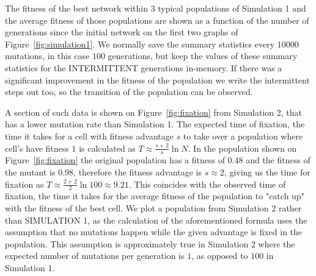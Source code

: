 \documentclass[a4paper,12pt]{article}
\begin{document}
The fitness of the best network within $3$ typical populations of Simulation 1 and the average fitness of those populations are shown as a function of the number of generations since the initial network on the first two graphs of Figure~\ref{fig:simulation1}. We normally save the summary statistics every $10000$ mutations, in this case $100$ generations, but keep the values of these summary statistics for the INTERMITTENT generations in-memory. If there was a significant improvement in the fitness of the population we write the intermittent steps out too, so the transition of the population can be observed. 

A section of such data is shown on Figure~\ref{fig:fixation} from Simulation 2, that has a lower mutation rate than Simulation 1. The expected time of fixation, the time it takes for a cell with fitness advantage $s$ to take over a population where cell's have fitness $1$ is calculated as $T \approx \frac{s+2}{s}\ln N$. \cite{barteklecture} In the population shown on Figure~\ref{fig:fixation} the original population has a fitness of $0.48$ and the fitness of the mutant is $0.98$, therefore the fitness advantage is $s\approx2$, giving us the time for fixation as $T\approx \frac{2+2}{2}\ln 100 \approx 9.21$. This coincides with the observed time of fixation, the time it takes for the average fitness of the population to "catch up" with the fitness of the best cell. We plot a population from Simulation 2 rather than SIMULATION 1, as the calculation of the aforementioned formula uses the assumption that no mutations happen while the given advantage is fixed in the population. This assumption is approximately true in Simulation 2 where the expected number of mutations per generation is $1$, as opposed to $100$ in Simulation 1.
\end{document}
